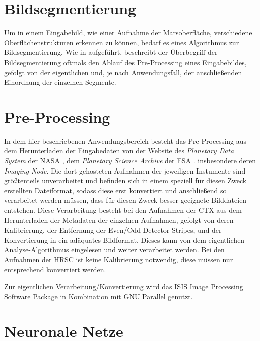 \section{Bildsegmentierung}
\label{sec:segmentierung}

Um in einem Eingabebild, wie \zB einer Aufnahme der Marsoberfläche, verschiedene Oberflächenstrukturen erkennen zu können, bedarf es eines Algorithmus zur Bildsegmentierung. Wie in \cite{bildsegmentierung_14} aufgeführt, beschreibt der Überbegriff der Bildsegmentierung oftmals den Ablauf des Pre-Processing eines Eingabebildes, gefolgt von der eigentlichen  und, je nach Anwendungsfall, der anschließenden Einordnung der einzelnen Segmente.

\section{Pre-Processing}
\label{sec:preprocessing}

In dem hier beschriebenen Anwendungsbereich besteht das Pre-Processing aus dem Herunterladen der Eingabedaten von der Website des \textit{Planetary Data System} der NASA \cite{pds}, \bzw dem \textit{Planetary Science Archive} der ESA \cite{psa}. insbesondere deren \textit{Imaging Node}. Die dort gehosteten Aufnahmen der jeweiligen Instumente sind größtenteils unverarbeitet und befinden sich in einem speziell für diesen Zweck erstellten Dateiformat, sodass diese erst konvertiert und anschließend so verarbeitet werden müssen, dass für diesen Zweck besser geeignete Bilddateien entstehen.
Diese Verarbeitung besteht bei den Aufnahmen der CTX aus dem Herunterladen der Metadaten der einzelnen Aufnahmen, gefolgt von deren Kalibrierung, der Entfernung der Even/Odd Detector Stripes, und der Konvertierung in ein adäquates Bildformat. Dieses kann von dem eigentlichen Analyse-Algorithmus eingelesen und weiter verarbeitet werden. Bei den Aufnahmen der HRSC ist keine Kalibrierung notwendig, diese müssen nur entsprechend konvertiert werden.

Zur eigentlichen Verarbeitung/Konvertierung wird das ISIS Image Processing Software Package \cite{isis} in Kombination mit GNU Parallel \cite{gnuparallel} genutzt.

\section{Neuronale Netze}
\label{sec:neuronalenetze}

